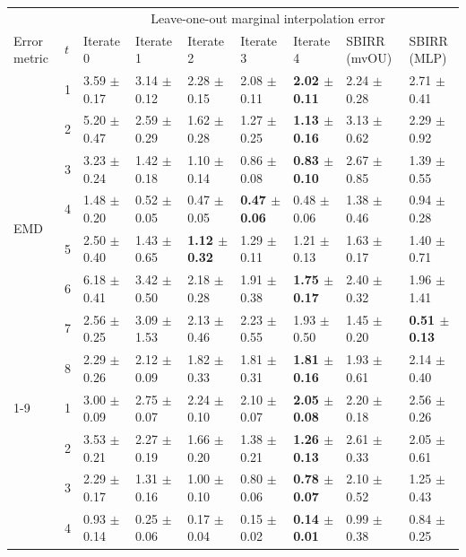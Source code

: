 \documentclass{article}
\theoremstyle{newstyle}
\begin{document}
\begin{table}
  \centering
  \scriptsize
  \begin{tabular}{lllllllll}
    \toprule
    &  & \multicolumn{7}{c}{Leave-one-out marginal interpolation error} \\
    Error metric & $t$ & Iterate 0 & Iterate 1 & Iterate 2 & Iterate 3 & Iterate 4 & SBIRR (mvOU) & SBIRR (MLP) \\
    \midrule
\multirow[c]{8}{*}{EMD} & 1 & 3.59 $\pm$ 0.17 & 3.14 $\pm$ 0.12 & 2.28 $\pm$ 0.15 & 2.08 $\pm$ 0.11 & \textbf{2.02 $\pm$ 0.11} & 2.24 $\pm$ 0.28 & 2.71 $\pm$ 0.41 \\
    & 2 & 5.20 $\pm$ 0.47 & 2.59 $\pm$ 0.29 & 1.62 $\pm$ 0.28 & 1.27 $\pm$ 0.25 & \textbf{1.13 $\pm$ 0.16} & 3.13 $\pm$ 0.62 & 2.29 $\pm$ 0.92 \\
    & 3 & 3.23 $\pm$ 0.24 & 1.42 $\pm$ 0.18 & 1.10 $\pm$ 0.14 & 0.86 $\pm$ 0.08 & \textbf{0.83 $\pm$ 0.10} & 2.67 $\pm$ 0.85 & 1.39 $\pm$ 0.55 \\
    & 4 & 1.48 $\pm$ 0.20 & 0.52 $\pm$ 0.05 & 0.47 $\pm$ 0.05 & \textbf{0.47 $\pm$ 0.06} & 0.48 $\pm$ 0.06 & 1.38 $\pm$ 0.46 & 0.94 $\pm$ 0.28 \\
    & 5 & 2.50 $\pm$ 0.40 & 1.43 $\pm$ 0.65 & \textbf{1.12 $\pm$ 0.32} & 1.29 $\pm$ 0.11 & 1.21 $\pm$ 0.13 & 1.63 $\pm$ 0.17 & 1.40 $\pm$ 0.71 \\
    & 6 & 6.18 $\pm$ 0.41 & 3.42 $\pm$ 0.50 & 2.18 $\pm$ 0.28 & 1.91 $\pm$ 0.38 & \textbf{1.75 $\pm$ 0.17} & 2.40 $\pm$ 0.32 & 1.96 $\pm$ 1.41 \\
    & 7 & 2.56 $\pm$ 0.25 & 3.09 $\pm$ 1.53 & 2.13 $\pm$ 0.46 & 2.23 $\pm$ 0.55 & 1.93 $\pm$ 0.50 & 1.45 $\pm$ 0.20 & \textbf{0.51 $\pm$ 0.13} \\
    & 8 & 2.29 $\pm$ 0.26 & 2.12 $\pm$ 0.09 & 1.82 $\pm$ 0.33 & 1.81 $\pm$ 0.31 & \textbf{1.81 $\pm$ 0.16} & 1.93 $\pm$ 0.61 & 2.14 $\pm$ 0.40 \\
    \cline{1-9}
    \multirow[c]{8}{*}{Energy} & 1 & 3.00 $\pm$ 0.09 & 2.75 $\pm$ 0.07 & 2.24 $\pm$ 0.10 & 2.10 $\pm$ 0.07 & \textbf{2.05 $\pm$ 0.08} & 2.20 $\pm$ 0.18 & 2.56 $\pm$ 0.26 \\
    & 2 & 3.53 $\pm$ 0.21 & 2.27 $\pm$ 0.19 & 1.66 $\pm$ 0.20 & 1.38 $\pm$ 0.21 & \textbf{1.26 $\pm$ 0.13} & 2.61 $\pm$ 0.33 & 2.05 $\pm$ 0.61 \\
    & 3 & 2.29 $\pm$ 0.17 & 1.31 $\pm$ 0.16 & 1.00 $\pm$ 0.10 & 0.80 $\pm$ 0.06 & \textbf{0.78 $\pm$ 0.07} & 2.10 $\pm$ 0.52 & 1.25 $\pm$ 0.43 \\
    & 4 & 0.93 $\pm$ 0.14 & 0.25 $\pm$ 0.06 & 0.17 $\pm$ 0.04 & 0.15 $\pm$ 0.02 & \textbf{0.14 $\pm$ 0.01} & 0.99 $\pm$ 0.38 & 0.84 $\pm$ 0.25 \\

\end{tabular}
\end{table}
\end{document}

